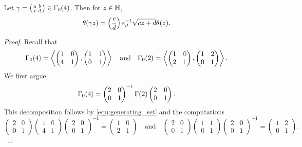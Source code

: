 \documentclass[12pt,reqno,oneside]{amsart}
\begin{document}
    \begin{theorem}\label{thm:modularity}
    Let $\gamma = \begin{psmallmatrix} a & b \\ c & d \end{psmallmatrix} \in \Gamma_{0}(4)$. Then for $z \in \mathbb{H}$,
    \[
        \theta(\gamma z) = \left(\frac{c}{d}\right)\varepsilon_{d}^{-1}\sqrt{cz+d}\theta(z).
    \]
    \end{theorem}
    \begin{proof}
        Recall that
        \begin{equation}\label{equ:generating_set}
            \Gamma_{0}(4) = \left\langle\begin{pmatrix} 1 & 0 \\ 4 & 1 \end{pmatrix},\begin{pmatrix} 1 & 1 \\ 0 & 1 \end{pmatrix}\right\rangle \quad \text{and} \quad \Gamma_{0}(2) = \left\langle\begin{pmatrix} 1 & 0 \\ 2 & 1 \end{pmatrix},\begin{pmatrix} 1 & 2 \\ 0 & 1 \end{pmatrix}\right\rangle.
        \end{equation}
        We first argue
        \[
            \Gamma_{0}(4) = \begin{pmatrix} 2 & 0 \\ 0 & 1 \end{pmatrix}^{-1} \Gamma(2) \begin{pmatrix} 2 & 0 \\ 0 & 1 \end{pmatrix}.
        \]
        This decomposition follows by \cref{equ:generating_set} and the computations
        \[
            \begin{pmatrix} 2 & 0 \\ 0 & 1 \end{pmatrix} \begin{pmatrix} 1 & 0 \\ 4 & 1 \end{pmatrix} \begin{pmatrix} 2 & 0 \\ 0 & 1 \end{pmatrix}^{-1} = \begin{pmatrix} 1 & 0 \\ 2 & 1 \end{pmatrix} \quad \text{and} \quad \begin{pmatrix} 2 & 0 \\ 0 & 1 \end{pmatrix} \begin{pmatrix} 1 & 1 \\ 0 & 1 \end{pmatrix} \begin{pmatrix} 2 & 0 \\ 0 & 1 \end{pmatrix}^{-1} = \begin{pmatrix} 1 & 2 \\ 0 & 1 \end{pmatrix}.
\]
\end{proof}
\end{document}
